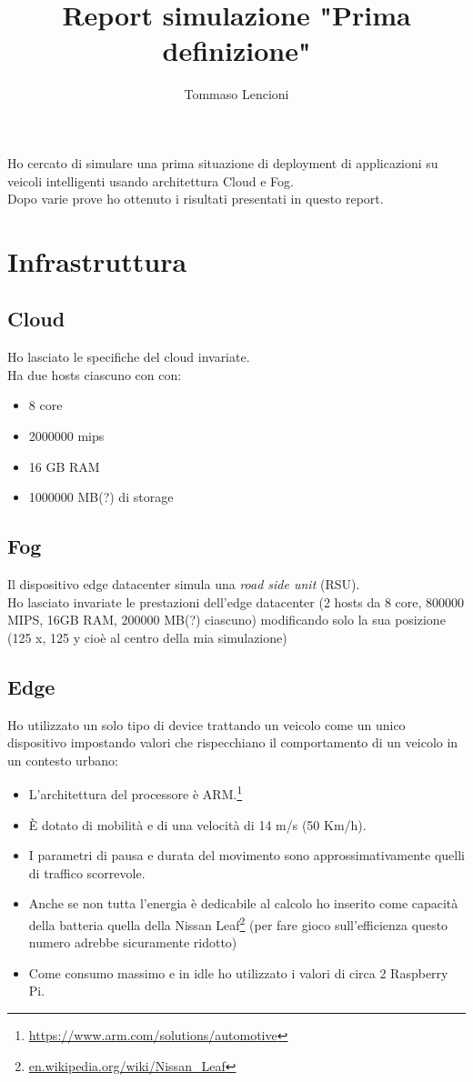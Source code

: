 \documentclass[12pt, a4paper]{report} %
\title{Report simulazione "Prima definizione"}
\author{Tommaso Lencioni}
\begin{document}
\maketitle
Ho cercato di simulare una prima situazione di deployment di applicazioni su veicoli intelligenti usando architettura Cloud e Fog.\\
Dopo varie prove ho ottenuto i risultati presentati in questo report.
\section*{Infrastruttura}
\subsection*{Cloud}
Ho lasciato le specifiche del cloud invariate.\\
Ha due hosts ciascuno con con:
\begin{itemize}
	\item 8 core
	\item 2000000 mips
	\item 16 GB RAM
	\item 1000000 MB(?) di storage
\end{itemize}

\subsection*{Fog}
Il dispositivo edge datacenter simula una \textit{road side unit} (RSU).\\
Ho lasciato invariate le prestazioni dell'edge datacenter (2 hosts da 8 core, 800000 MIPS, 16GB RAM, 200000 MB(?) ciascuno) modificando solo la sua posizione (125 x, 125 y cioè al centro della mia simulazione)
\subsection*{Edge}
Ho utilizzato un solo tipo di device trattando un veicolo come un unico dispositivo impostando valori che rispecchiano il comportamento di un veicolo in un contesto urbano:

 \begin{itemize}
	\item L'architettura del processore è ARM.\footnote{ \url{https://www.arm.com/solutions/automotive}}
        \item È dotato di mobilità e di una velocità di 14 m/s (50 Km/h).
        \item I parametri di pausa e durata del movimento sono approssimativamente quelli di traffico scorrevole.
        \item Anche se non tutta l'energia è dedicabile al calcolo ho inserito come capacità della batteria quella della Nissan Leaf\footnote{\url{en.wikipedia.org/wiki/Nissan_Leaf}} (per fare gioco sull'efficienza questo numero adrebbe sicuramente ridotto)
	\item Come consumo massimo e in idle ho utilizzato i valori di circa 2 Raspberry Pi.
    \end{itemize}
\end{document}
